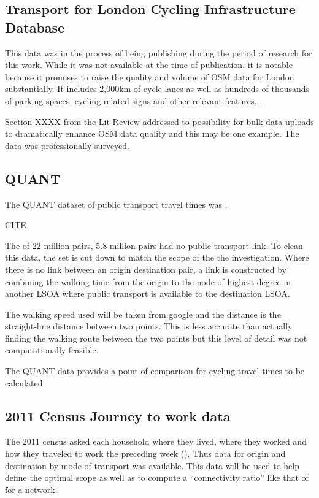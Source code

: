 \subsection{Transport for London Cycling Infrastructure Database}

\cite{tflcid}

This data was in the process of being publishing during the period of research for this work. While it was not available at the time of publication, it is notable because it promises to raise the quality and volume of OSM data for London substantially. It includes 2,000km of cycle lanes as well as hundreds of thousands of parking spaces, cycling related signs and other relevant features. \cite{osmtflcidwiki}. 

Section XXXX from the Lit Review addressed to possibility for bulk data uploads to dramatically enhance OSM data quality and this may be one example. The data was professionally surveyed. 

\subsection{QUANT}

The QUANT dataset of public transport travel times was .

CITE

The of 22 million pairs, 5.8 million pairs had no public transport link. To clean this data, the set is cut down to match the scope of the the investigation. Where there is no link between an origin destination pair, a link is constructed by combining the walking time from the origin to the node of highest degree in another LSOA where public transport is available to the destination LSOA. 

The walking speed used will be taken from google and the distance is the straight-line distance between two points. This is less accurate than actually finding the walking route between the two points but this level of detail was not computationally feasible. 

The QUANT data provides a point of comparison for cycling travel times to be calculated. 

\subsection{2011 Census Journey to work data}

The 2011 census asked each household where they lived, where they worked and how they traveled to work the preceding week (\cite{jtw}). Thus data for origin and destination by mode of transport was available. This data will be used to help define the optimal scope as well as to compute a ``connectivity ratio'' like that of \cite{furth2016network} for a network. 

